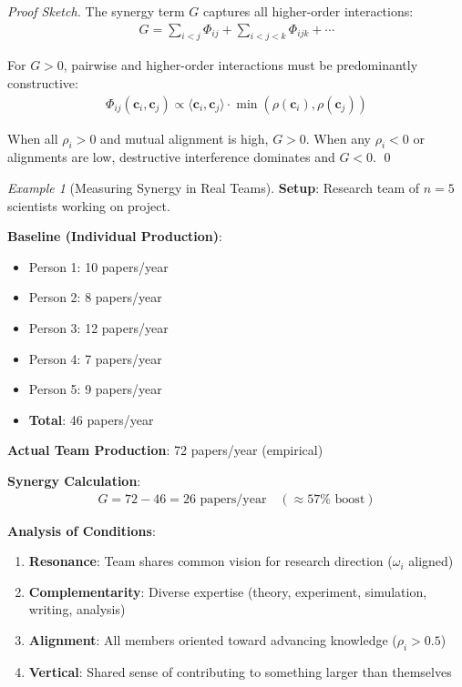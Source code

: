 \documentclass[11pt,a4paper]{article}
\theoremstyle{definition}
\theoremstyle{remark}
\newtheorem{example}{Example}[section]
\newcommand{\cc}{\mathbf{c}}
\begin{document}
\begin{small}
\begin{enumerate}
\begin{proof}[Proof Sketch]
The synergy term \(G\) captures all higher-order interactions:
\begin{align}
G = \sum_{i<j} \Phi_{ij} + \sum_{i<j<k} \Phi_{ijk} + \cdots
\end{align}

For \(G > 0\), pairwise and higher-order interactions must be predominantly constructive:
\begin{align}
\Phi_{ij}(\cc_i, \cc_j) \propto \langle \cc_i, \cc_j \rangle \cdot \min(\rho(\cc_i), \rho(\cc_j))
\end{align}

When all \(\rho_i > 0\) and mutual alignment is high, \(G > 0\). When any \(\rho_i < 0\) or alignments are low, destructive interference dominates and \(G < 0\). \qed
\end{proof}

\begin{example}[Measuring Synergy in Real Teams]
\textbf{Setup}: Research team of \(n=5\) scientists working on project.

\textbf{Baseline (Individual Production)}:
\begin{itemize}
    \item Person 1: 10 papers/year
    \item Person 2: 8 papers/year
    \item Person 3: 12 papers/year
    \item Person 4: 7 papers/year
    \item Person 5: 9 papers/year
    \item \textbf{Total}: 46 papers/year
\end{itemize}

\textbf{Actual Team Production}: 72 papers/year (empirical)

\textbf{Synergy Calculation}:
\begin{align}
G = 72 - 46 = 26 \text{ papers/year} \quad (\approx 57\% \text{ boost})
\end{align}

\textbf{Analysis of Conditions}:
\begin{enumerate}
    \item \textbf{Resonance}: Team shares common vision for research direction (\(\omega_i\) aligned)
    \item \textbf{Complementarity}: Diverse expertise (theory, experiment, simulation, writing, analysis)
    \item \textbf{Alignment}: All members oriented toward advancing knowledge (\(\rho_i > 0.5\))
    \item \textbf{Vertical}: Shared sense of contributing to something larger than themselves
\end{enumerate}


\end{example}
\end{enumerate}
\end{small}
\end{document}
